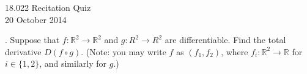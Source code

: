 \documentclass[11pt]{article}
\theoremstyle{definition}
\newcommand{\R}{\mathbb{R}}
\newcounter{prob}
\newcounter{subprob}
\newcommand\itm{\theprob.  \stepcounter{prob}\setcounter{subprob}{1}}
\newcommand\sol[2]{\iftoggle{solutions}{\textit{Solution}. #1}{#2}}
\begin{document}
\thispagestyle{empty}

\begin{center}
  18.022 Recitation Quiz \iftoggle{solutions}{(with solutions)}{} \\
  20 October 2014 
\end{center}

\itm Suppose that $f:\R^2 \to \R^2$ and $g:R^2 \to R^2$ are
differentiable. Find the total derivative $D(f\circ g)$. (Note: you may
write $f$ as $(f_1,f_2)$, where $f_i: \R^2 \to \R$ for $i\in \{1,2\}$, and
similarly for $g$.) 

\sol{Let's use the variables $s$ and $t$ for the arguments of $g$, and
  let's use the variables $x$ and $y$ for the arguments of $f$. The
  composition $f\circ g$ is given by
\[
(f\circ g)(s,t) = (f_1(g_1(s,t),g_2(s,t)), f_2(g_1(s,t),g_2(s,t))).
\]
By the chain rule, the partial derivative of $f_1(g_1(s,t),g_2(s,t))$ with
respect to $s$ is
\[
\frac{\partial f_1}{\partial x}\frac{\partial g_1}{\partial s}
+ \frac{\partial f_1}{\partial y}\frac{\partial g_2}{\partial s}. 
\]
Doing similar calculations for the other terms, we end up with 
\[
(D(f\circ g))(s,t) =
\left(
\begin{array}{cc}
\frac{\partial f_1}{\partial x}\frac{\partial g_1}{\partial s}
+ \frac{\partial f_1}{\partial y}\frac{\partial g_2}{\partial s} & 
\frac{\partial f_1}{\partial x}\frac{\partial g_1}{\partial t}
+ \frac{\partial f_1}{\partial y}\frac{\partial g_2}{\partial t} \\
\frac{\partial f_2}{\partial x}\frac{\partial g_1}{\partial s}
+ \frac{\partial f_2}{\partial y}\frac{\partial g_2}{\partial s} & 
\frac{\partial f_2}{\partial x}\frac{\partial g_1}{\partial t}
+ \frac{\partial f_2}{\partial y}\frac{\partial g_2}{\partial t} 
\end{array} 
\right).
\]
}{}
\end{document}
